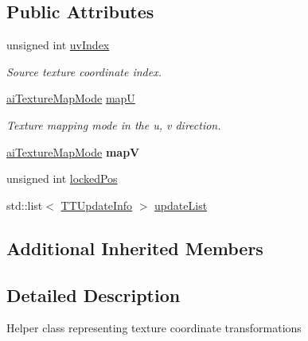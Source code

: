 \subsection*{Public Attributes}
\begin{DoxyCompactItemize}
\item 
\hypertarget{struct_assimp_1_1_s_transform_vec_info_a97270544cd32c6c27e98b0c7be047e89}{unsigned int \hyperlink{struct_assimp_1_1_s_transform_vec_info_a97270544cd32c6c27e98b0c7be047e89}{uv\+Index}}\label{struct_assimp_1_1_s_transform_vec_info_a97270544cd32c6c27e98b0c7be047e89}

\begin{DoxyCompactList}\small\item\em Source texture coordinate index. \end{DoxyCompactList}\item 
\hypertarget{struct_assimp_1_1_s_transform_vec_info_a8262c5fe0e019113218c8e24f379fc30}{\hyperlink{material_8h_a6cbe56056751aa80e8dd714632a49de0}{ai\+Texture\+Map\+Mode} \hyperlink{struct_assimp_1_1_s_transform_vec_info_a8262c5fe0e019113218c8e24f379fc30}{map\+U}}\label{struct_assimp_1_1_s_transform_vec_info_a8262c5fe0e019113218c8e24f379fc30}

\begin{DoxyCompactList}\small\item\em Texture mapping mode in the u, v direction. \end{DoxyCompactList}\item 
\hypertarget{struct_assimp_1_1_s_transform_vec_info_a87dde2dcf287af043b657ff90e599b13}{\hyperlink{material_8h_a6cbe56056751aa80e8dd714632a49de0}{ai\+Texture\+Map\+Mode} {\bfseries map\+V}}\label{struct_assimp_1_1_s_transform_vec_info_a87dde2dcf287af043b657ff90e599b13}

\item 
unsigned int \hyperlink{struct_assimp_1_1_s_transform_vec_info_a3233c0d7f6a3caefa25aaa2740edd443}{locked\+Pos}
\item 
std\+::list$<$ \hyperlink{struct_assimp_1_1_t_t_update_info}{T\+T\+Update\+Info} $>$ \hyperlink{struct_assimp_1_1_s_transform_vec_info_a6ccefe9b1d6992c90f0a310ae568bd9d}{update\+List}
\end{DoxyCompactItemize}
\subsection*{Additional Inherited Members}


\subsection{Detailed Description}
Helper class representing texture coordinate transformations 

